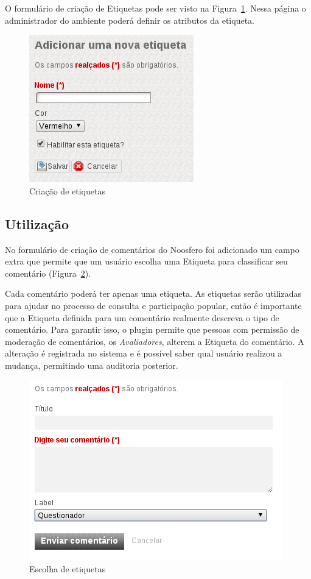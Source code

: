 \documentclass[11pt]{article}
\begin{document}
O formulário de criação de Etiquetas pode ser visto na
Figura~\ref{fig:new-label-page}. Nessa página o administrador
do ambiente poderá definir os atributos da etiqueta.

\begin{figure}[h]
\center
\includegraphics[scale=0.8]{new-label-page.png}
\caption{Criação de etiquetas}
\label{fig:new-label-page}
\end{figure}


\subsection{Utilização}

No formulário de criação de comentários do Noosfero foi adicionado um
campo extra que permite que um usuário escolha uma Etiqueta para
classificar seu comentário (Figura~\ref{fig:comment-add}).

Cada comentário poderá ter apenas uma etiqueta. As etiquetas serão
utilizadas para ajudar no processo de consulta e participação popular,
então é importante que a Etiqueta definida para um comentário realmente
descreva o tipo de comentário. Para garantir isso, o plugin permite que
pessoas com permissão de moderação de comentários, os {\it Avaliadores},
alterem a Etiqueta do comentário. A alteração é registrada no sistema e
é possível saber qual usuário realizou a mudança, permitindo uma
auditoria posterior.

\begin{figure}[h]
\center
\includegraphics[scale=0.8]{comment-add.png}
\caption{Escolha de etiquetas}
\label{fig:comment-add}
\end{figure}
\end{document}
